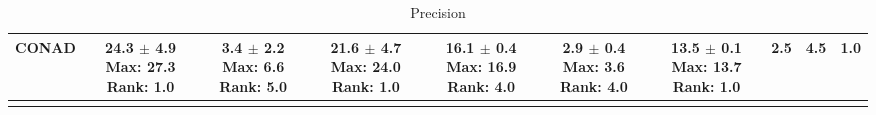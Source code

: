 \begin{longtable}{|l|c|c|c|c|c|c|c|c|c|}
CONAD & \makecell{ 24.3 $\pm$ 4.9 \\ \scriptsize Max: 27.3 \\ \scriptsize Rank: 1.0 } & \makecell{ 3.4 $\pm$ 2.2 \\ \scriptsize Max: 6.6 \\ \scriptsize Rank: 5.0 } & \makecell{ 21.6 $\pm$ 4.7 \\ \scriptsize Max: 24.0 \\ \scriptsize Rank: 1.0 } & \makecell{ 16.1 $\pm$ 0.4 \\ \scriptsize Max: 16.9 \\ \scriptsize Rank: 4.0 } & \makecell{ 2.9 $\pm$ 0.4 \\ \scriptsize Max: 3.6 \\ \scriptsize Rank: 4.0 } & \makecell{ 13.5 $\pm$ 0.1 \\ \scriptsize Max: 13.7 \\ \scriptsize Rank: 1.0 } & 2.5 & 4.5 & 1.0 \\ \hline 
\caption{ Precision } \label{tab:synth_pr}
\end{longtable}
